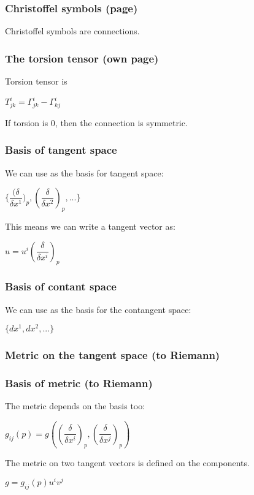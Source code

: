 \subsubsection{Christoffel symbols (page)}

Christoffel symbols are connections.

\subsubsection{The torsion tensor (own page)}

Torsion tensor is

\(T_{jk}^i=\Gamma^i_{jk}-\Gamma^i_{kj}\)


If torsion is \(0\), then the connection is symmetric.

\subsubsection{Basis of tangent space}

We can use as the basis for tangent space:

\(\{\dfrac{(\delta }{\delta x^1})_p,(\dfrac{\delta }{\delta x^2})_p,...\}\)


This means we can write a tangent vector as:

\(u=u^i(\dfrac{\delta }{\delta x^i})_p\)

\subsubsection{Basis of contant space}

We can use as the basis for the contangent space:

\(\{dx^1,dx^2,...\}\)

\subsubsection{Metric on the tangent space (to Riemann)}

\subsubsection{Basis of metric (to Riemann)}

The metric depends on the basis too:

\(g_{ij}(p)=g((\dfrac{\delta }{\delta x^i})_p,(\dfrac{\delta }{\delta x^j})_p)\)

The metric on two tangent vectors is defined on the components.

\(g=g_{ij}(p)u^iv^j\)

